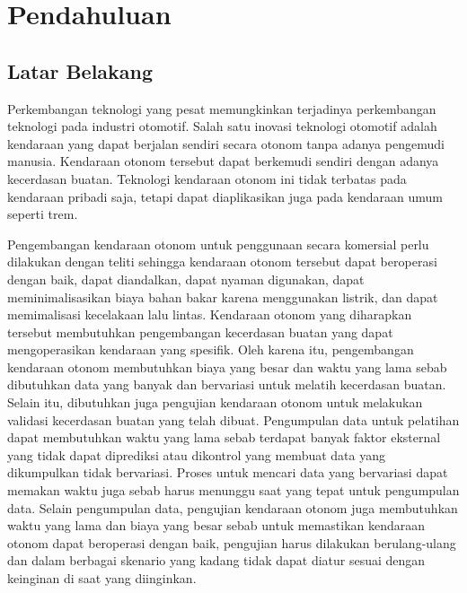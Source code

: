 \chapter{Pendahuluan}


\section{Latar Belakang}

Perkembangan teknologi yang pesat memungkinkan terjadinya perkembangan teknologi
pada industri otomotif. Salah satu inovasi teknologi otomotif adalah kendaraan
yang dapat berjalan sendiri secara otonom tanpa adanya pengemudi manusia.
Kendaraan otonom tersebut dapat berkemudi sendiri dengan adanya kecerdasan
buatan. Teknologi kendaraan otonom ini tidak terbatas pada kendaraan pribadi
saja, tetapi dapat diaplikasikan juga pada kendaraan umum seperti trem.

Pengembangan kendaraan otonom untuk penggunaan secara komersial perlu dilakukan
dengan teliti sehingga kendaraan otonom tersebut dapat beroperasi dengan baik,
dapat diandalkan, dapat nyaman digunakan, dapat meminimalisasikan biaya bahan
bakar karena menggunakan listrik, dan dapat memimalisasi kecelakaan lalu lintas.
Kendaraan otonom yang diharapkan tersebut membutuhkan pengembangan kecerdasan
buatan yang dapat mengoperasikan kendaraan yang spesifik. Oleh karena itu,
pengembangan kendaraan otonom membutuhkan biaya yang besar dan waktu yang lama
sebab dibutuhkan data yang banyak dan bervariasi untuk melatih kecerdasan
buatan. Selain itu, dibutuhkan juga pengujian kendaraan otonom untuk melakukan
validasi kecerdasan buatan yang telah dibuat. Pengumpulan data untuk pelatihan
dapat membutuhkan waktu yang lama sebab terdapat banyak faktor eksternal yang
tidak dapat diprediksi atau dikontrol yang membuat data yang dikumpulkan tidak
bervariasi. Proses untuk mencari data yang bervariasi dapat memakan waktu juga
sebab harus menunggu saat yang tepat untuk pengumpulan data. Selain pengumpulan
data, pengujian kendaraan otonom juga membutuhkan waktu yang lama dan biaya yang
besar sebab untuk memastikan kendaraan otonom dapat beroperasi dengan baik,
pengujian harus dilakukan berulang-ulang dan dalam berbagai skenario yang kadang
tidak dapat diatur sesuai dengan keinginan di saat yang diinginkan.


